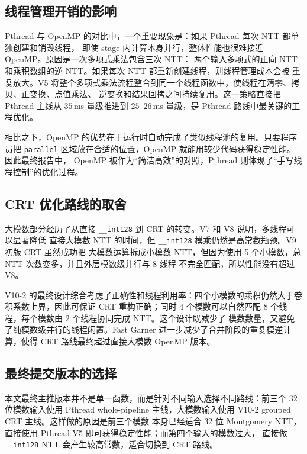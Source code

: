 \documentclass[UTF8,a4paper,10pt]{ctexart}
\begin{document}
\subsection{线程管理开销的影响}

Pthread 与 OpenMP 的对比中，一个重要现象是：如果 Pthread 每次 NTT 都单独创建和销毁线程，
即使 stage 内计算本身并行，整体性能也很难接近 OpenMP。原因是一次多项式乘法包含三次 NTT：
两个输入多项式的正向 NTT 和乘积数组的逆 NTT。如果每次 NTT 都重新创建线程，则线程管理成本会被
重复放大。V5 将整个多项式乘法流程整合到同一个线程函数中，使线程在清零、拷贝、正变换、点值乘法、
逆变换和结果回拷之间持续复用。这一策略直接把 Pthread 主线从 $35$\,ms 量级推进到 $25$--$26$\,ms
量级，是 Pthread 路线中最关键的工程优化。

相比之下，OpenMP 的优势在于运行时自动完成了类似线程池的复用。只要程序员把
\texttt{parallel} 区域放在合适的位置，OpenMP 就能用较少代码获得稳定性能。因此最终报告中，
OpenMP 被作为“简洁高效”的对照，Pthread 则体现了“手写线程控制”的优化过程。

\subsection{CRT 优化路线的取舍}

大模数部分经历了从直接 \texttt{\_\_int128} 到 CRT 的转变。V7 和 V8 说明，多线程可以显著降低
直接大模数 NTT 的时间，但 \texttt{\_\_int128} 模乘仍然是高常数瓶颈。V9 初版 CRT 虽然成功把
大模数运算拆成小模数 NTT，但因为使用 5 个小模数，总 NTT 次数变多，并且外层模数级并行与 8 线程
不完全匹配，所以性能没有超过 V8。

V10-2 的最终设计综合考虑了正确性和线程利用率：四个小模数的乘积仍然大于卷积系数上界，因此可保证
CRT 重构正确；同时 4 个模数可以自然匹配 8 个线程，每个模数由 2 个线程协同完成 NTT。这个设计既减少了
模数数量，又避免了纯模数级并行的线程闲置。Fast Garner 进一步减少了合并阶段的重复模逆计算，使得
CRT 路线最终超过直接大模数 OpenMP 版本。

\subsection{最终提交版本的选择}

本文最终主推版本并不是单一函数，而是针对不同输入选择不同路线：前三个 32 位模数输入使用
Pthread whole-pipeline 主线，大模数输入使用 V10-2 grouped CRT 主线。这样做的原因是前三个模数
本身已经适合 32 位 Montgomery NTT，直接使用 Pthread V5 即可获得稳定性能；而第四个输入的模数过大，
直接做 \texttt{\_\_int128} NTT 会产生较高常数，适合切换到 CRT 路线。
\end{document}
